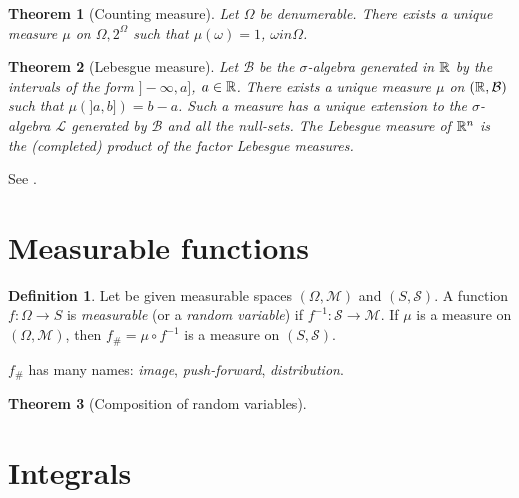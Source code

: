 \documentclass[12pt,a4paper]{amsart}
\theoremstyle{plain}%
\newtheorem{theorem}{Theorem}%
\theoremstyle{definition}
\newtheorem{definition}{Definition}%
\theoremstyle{remark}
\begin{document}
\begin{theorem}[Counting measure] Let $\Omega$ be denumerable. There
  exists a unique measure $\mu$ on $\Omega,2^\Omega$ such that
  $\mu(\omega) = 1$, $\omega in \Omega$.
\end{theorem}

\begin{theorem}[Lebesgue measure] Let $\mathcal B$ be the
  $\sigma$-algebra generated in $\mathbb{R}$ by the intervals of the form
  $]-\infty,a]$, $a\in\mathbb{R}$. There exists a unique measure $\mu$ on
  $(\mathbb{R},\mathcal B)$ such that $\mu(]a,b])=b-a$. Such a measure has
  a unique extension to the $\sigma$-algebra $\mathcal L$ generated by
  $\mathcal B$ and all the null-sets. The Lebesgue measure of
  $\mathbb{R}^n$ is the (completed) product of the factor Lebesgue measures.
\end{theorem}
See \cite[Th. 2.20]{rudin:1987-3rd}.

\section{Measurable functions}
\label{sec:measurable-functions}

\begin{definition}
  Let be given measurable spaces $(\Omega,\mathcal M)$ and
  $(S,\mathcal S)$. A function $f \colon \Omega \to S$ is \emph{measurable}
  (or a \emph{random variable}) if $f^{-1} \colon \mathcal S \to
  \mathcal M$. If $\mu$ is a measure on $(\Omega,\mathcal M)$, then
  $f_\# = \mu \circ f^{-1}$ is a measure on $(S,\mathcal S)$.
\end{definition}
$f_\#$ has many names: \emph{image}, \emph{push-forward},
\emph{distribution}.

\begin{theorem}[Composition of random variables]
\end{theorem}
\section{Integrals}
\label{sec:integrals}



\end{document}
